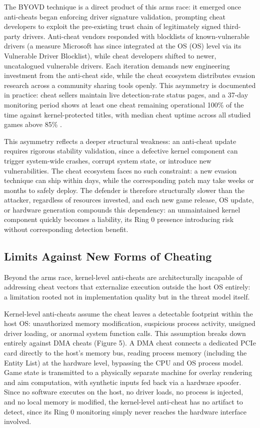 The BYOVD technique is a direct product of this arms race: it emerged once anti-cheats began enforcing driver signature validation, prompting cheat developers to exploit the pre-existing trust chain of legitimately signed third-party drivers. Anti-cheat vendors responded with blocklists of known-vulnerable drivers (a measure Microsoft has since integrated at the \gls{OS} (OS) level via its Vulnerable Driver Blocklist), while cheat developers shifted to newer, uncatalogued vulnerable drivers. Each iteration demands new engineering investment from the anti-cheat side, while the cheat ecosystem distributes evasion research across a community sharing tools openly. This asymmetry is documented in practice: cheat sellers maintain live detection-rate status pages, and a 37-day monitoring period shows at least one cheat remaining operational 100\% of the time against kernel-protected titles, with median cheat uptime across all studied games above 85\% \cite{Collins2024}.

This asymmetry reflects a deeper structural weakness: an anti-cheat update requires rigorous stability validation, since a defective kernel component can trigger system-wide crashes, corrupt system state, or introduce new vulnerabilities. The cheat ecosystem faces no such constraint: a new evasion technique can ship within days, while the corresponding patch may take weeks or months to safely deploy. The defender is therefore structurally slower than the attacker, regardless of resources invested, and each new game release, OS update, or hardware generation compounds this dependency: an unmaintained kernel component quickly becomes a liability, its Ring 0 presence introducing risk without corresponding detection benefit.

\subsection{Limits Against New Forms of Cheating}
\label{sec:two:one:two}

Beyond the arms race, kernel-level anti-cheats are architecturally incapable of addressing cheat vectors that externalize execution outside the host OS entirely: a limitation rooted not in implementation quality but in the threat model itself.

Kernel-level anti-cheats assume the cheat leaves a detectable footprint within the host OS: unauthorized memory modification, suspicious process activity, unsigned driver loading, or anormal system function calls. This assumption breaks down entirely against DMA cheats (Figure 5). A DMA cheat connects a dedicated PCIe card directly to the host's memory bus, reading process memory (including the Entity List) at the hardware level, bypassing the CPU and OS process model. Game state is transmitted to a physically separate machine for overlay rendering and aim computation, with synthetic inputs fed back via a hardware spoofer. Since no software executes on the host, no driver loads, no process is injected, and no local memory is modified, the kernel-level anti-cheat has no artifact to detect, since its Ring 0 monitoring simply never reaches the hardware interface involved.

